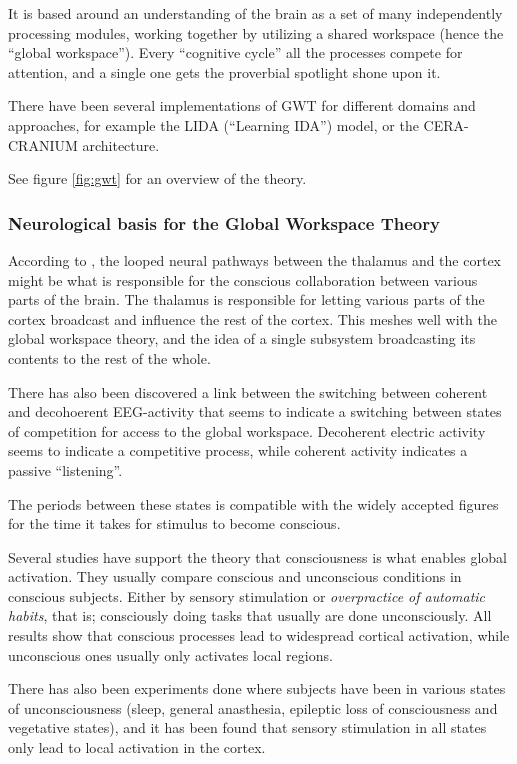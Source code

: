 It is based around an understanding of the brain as a set of many independently
processing modules, working together by utilizing a shared workspace (hence the
``global workspace''). Every ``cognitive cycle'' all the
processes compete for attention, and a single one gets the
proverbial spotlight shone upon it.\cite{baars2005gwt}

There have been several implementations of GWT for different domains and
approaches, for example the LIDA (``Learning IDA'')
model\cite{franklin2007lida}, or the CERA-CRANIUM
architecture\cite{arrabales2009ceracranium}.

See figure \ref{fig:gwt} for an overview of the theory.

\subsubsection{Neurological basis for the Global Workspace Theory}
According to \cite{llinas1998neuronal}, the looped neural pathways between the
thalamus and the cortex might be what is responsible for the conscious
collaboration between various parts of the brain. The thalamus is responsible
for letting various parts of the cortex broadcast and influence the rest of the
cortex. This meshes well with the global workspace theory, and the idea of a
single subsystem broadcasting its contents to the rest of the whole.

There has also been discovered a link between the switching between coherent and
decohoerent EEG-activity that seems to indicate a switching between states of
competition for access to the global workspace. Decoherent electric activity
seems to indicate a competitive process, while coherent activity indicates a
passive ``listening''.\cite{freeman2003neurobiological}

The periods between these states is compatible with
the widely accepted figures for the time it takes for
stimulus to become conscious.\cite{shanahan2005applying}

Several studies have support the theory that consciousness is what enables
global activation. They usually compare conscious and unconscious conditions in
conscious subjects. Either by sensory stimulation or {\em overpractice of
automatic habits}, that is; consciously doing tasks that usually are done
unconsciously. All results show that conscious processes lead to widespread
cortical activation, while unconscious ones usually only activates local
regions.\cite{baars2003brain}

There has also been experiments done where subjects have been in various states
of unconsciousness (sleep, general anasthesia, epileptic loss of consciousness
and vegetative states), and it has been found that sensory stimulation in all
states only lead to local activation in the cortex.\cite{shanahan2005applying}

